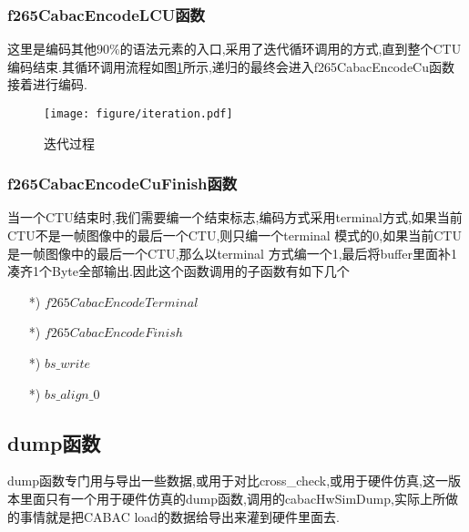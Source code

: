 \documentclass[UTF8,a4paper,12pt]{ctexart}
\begin{document}
\subsubsection{f265CabacEncodeLCU函数}
这里是编码其他$90\%$的语法元素的入口,采用了迭代循环调用的方式,直到整个CTU编码结束.其循环调用流程如图\ref{fig3}所示,递归的最终会进入f265CabacEncodeCu函数接着进行编码.
\begin{figure}[H]
\centering
\texttt{[image: figure/iteration.pdf]}
\caption{迭代过程}\label{fig3}
\end{figure}

\subsubsection{f265CabacEncodeCuFinish函数}
当一个CTU结束时,我们需要编一个结束标志,编码方式采用terminal方式,如果当前CTU不是一帧图像中的最后一个CTU,则只编一个terminal 模式的0,如果当前CTU是一帧图像中的最后一个CTU,那么以terminal 方式编一个1,最后将buffer里面补1凑齐1个Byte全部输出.因此这个函数调用的子函数有如下几个
\begin{itemize}[itemindent=25pt]
\item [*)] $f265CabacEncodeTerminal$
\item [*)] $f265CabacEncodeFinish$
\item [*)] $bs\_write$
\item [*)] $bs\_align\_0$
\end{itemize}

\subsection{dump函数}
dump函数专门用与导出一些数据,或用于对比cross\_check,或用于硬件仿真,这一版本里面只有一个用于硬件仿真的dump函数,调用的cabacHwSimDump,实际上所做的事情就是把CABAC load的数据给导出来灌到硬件里面去.
\end{document}
